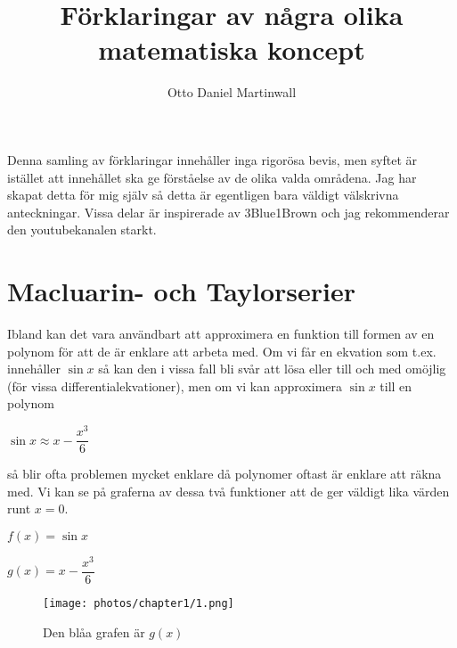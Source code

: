 \documentclass[10pt, a4paper]{amsart}
\begin{document}
\title{Förklaringar av några olika matematiska koncept}
\author{Otto Daniel Martinwall}
\date{}
\maketitle
\tableofcontents

\newpage

Denna samling av förklaringar innehåller inga rigorösa bevis, men syftet är istället att innehållet ska ge förståelse av de olika valda områdena.
Jag har skapat detta för mig själv så detta är egentligen bara väldigt välskrivna anteckningar.
Vissa delar är inspirerade av 3Blue1Brown och jag rekommenderar den youtubekanalen starkt.
\bigskip

\newpage
\section{Macluarin- och Taylorserier}   

\bigskip
Ibland kan det vara användbart att approximera en funktion till formen av en polynom för att de är enklare att arbeta med. 
Om vi får en ekvation som t.ex. innehåller $\sin x$ så kan den i vissa fall bli svår att lösa eller till och med omöjlig (för vissa differentialekvationer), 
men om vi kan approximera $ \sin x $ till en polynom
\vspace{24pt plus 4pt minus 4pt}

\hspace{5ex}
$ \sin x \approx x - \dfrac{x^3}{6} $
\vspace{24pt plus 4pt minus 4pt}

så blir ofta problemen mycket enklare då polynomer oftast är enklare att räkna med.
Vi kan se på graferna av dessa två funktioner att de ger väldigt lika värden runt $ x = 0 $.
\vspace{24pt plus 4pt minus 4pt}

\hspace{5ex}
$ f(x) = \sin x $

\hspace{5ex}
$ g(x) = x - \dfrac{x^3}{6} $

\begin{figure}[ht!]
    \texttt{[image: photos/chapter1/1.png]}
    \centerline{Den blåa grafen är $ g(x) $}
\end{figure}
\bigskip
\end{document}
